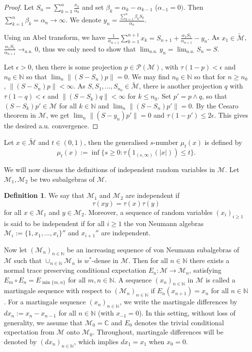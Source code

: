 \documentclass[10pt]{amsart}
\theoremstyle{definition}
\newtheorem{defn}[thm]{Definition}
\theoremstyle{myremark}
\numberwithin{equation}{section}
\def\C{\mathbb C}
\def\N{\mathbb N}
\newcommand{\CM}{\mathcal{M}}
\newcommand{\CP}{\mathcal{P}}
\newcommand{\abs}[1]{\left\vert#1\right\vert}
\begin{document}
   \begin{proof}
Let $S_n=\sum_{k=1}^n \frac {x_k}{\alpha_k}$ and set $\beta_k=\alpha_k-\alpha_{k-1}$ ($\alpha_{-1}=0)$. Then $\sum_{k=1}^n \beta_k=\alpha_n\to \infty$. We denote $y_n=\frac{\sum_{k=1}^n \beta_k S_k}{\alpha_n}$.

     Using an Abel transform, we have
     $\frac 1 {\alpha_{n+1}}\sum_{k=1}^{n+1} x_k=S_{n+1}+\frac{\alpha_1S_1}
     {\alpha_{n+1}}-y_n$. As $x_1\in \widetilde{\CM}$, $\frac{\alpha_1S_1}
     {\alpha_{n+1}}\to_{a.u.}0$, thus we only need to show that $\lim_{a.u.}y_n=\lim_{a.u.}S_n=S$.

     Let $\epsilon>0$, then there is some projection $p\in\CP(\CM)$,
     with $\tau(1-p)<\epsilon$ and $n_0\in \N$ so that
     $\lim_n \|(S-S_n)p\|=0$. We may find $n_0\in \N$ so that for
     $n\geq n_0$, $\|(S-S_n)p\|<\infty$.  As
     $S,S_1,...,S_{n_0}\in \widetilde{\CM}$, there is another projection
     $q$ with  $\tau(1-q)<\epsilon$ and $\|(S-S_k)q\|<\infty$ for $k\leq n_0$.
     Set $p'=p\wedge q$, so that $(S-S_k)p'\in \CM$ for all $k\in \N$ and
     $\lim_n \|(S-S_n)p'\|=0$. By the Cesaro theorem in $\CM$, we get
     $\lim_n \|(S-y_n)p'\|=0$ and $\tau(1-p')\leq 2\epsilon$. This gives the desired a.u. convergence.    
   \end{proof}
   
Let $x \in \widetilde{\CM}$ and $t\in(0,1)$, then the generalised $s$-number $\mu_t(x)$ is defined by
$$
\mu_t(x):= \inf \{ s \ge 0: \tau(1_{(s, \infty)}(\abs{x})) \leq t \}.
$$

We will now discuss the definitions of independent random variables in $\CM$. Let $\CM_1, \CM_2$ be two subalgebras of $\CM$. 
\begin{defn}
    We say that $\CM_1$ and $\CM_2$ are independent if 
    $$
    \tau(xy)= \tau(x) \tau(y)
    $$
    for all $x \in \CM_1$ and $y \in \CM_2$. Moreover, a sequence of random variables $(x_i)_{i \geq 1}$ is said to be independent if for all $i\geq 1$ the von Neumann algebras  $\CM_i:= \{1, x_1,...,x_i \}''$ and ${x_{i+1}}''$ are independent.
\end{defn}




Now let $(\CM_n)_{n \in \N}$ be an increasing sequence of von Neumann subalgebras of $\CM$ such that $\cup_{n \in \N} \CM_n$ is $w^*$-dense in $\CM$. Then for all $n \in \N$ there exists a normal  trace preserving conditional expectation $E_n: \CM \to \CM_n$, satisfying $E_m \circ E_n= E_{\min\{m,n\}}$ for all $m,n \in \N$. A sequence $(x_n)_{n \in \N}$ in $\CM$ is called a martingale sequence with respect to $(\CM_n)_{n \in \N}$ if $E_n(x_{n+1})= x_n$ for all $n \in \N$. For a martingale sequence $(x_n)_{n \in \N}$, we write the martingale differences by $dx_n:= x_n- x_{n-1}$ for all $n \in \N$ (with $x_{-1}=0$). In this setting, without loss of generality, we assume that $\CM_0 = \C$ and $E_0$ denotes the trivial conditional expectation from $\CM$ onto $\CM_0$. Throughout, martingale differences will be denoted by $(dx_n)_{n \in \N}$, which implies $dx_1=x_1$ when $x_0=0$.
\end{document}
